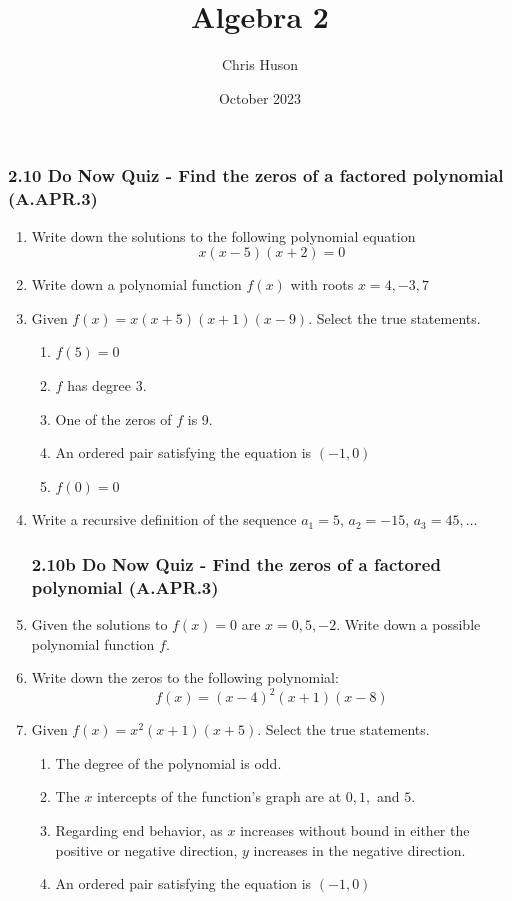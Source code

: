 \documentclass[12pt, twoside]{article}
\title{Algebra 2}
\author{Chris Huson}
\date{October 2023}
\begin{document}
\subsubsection*{2.10 Do Now Quiz - Find the zeros of a factored polynomial (A.APR.3)}
\begin{enumerate}[itemsep=1.5cm]
\item Write down the solutions to the following polynomial equation
\[x(x-5)(x+2)=0\]

\item Write down a polynomial function $f(x)$ with roots $x=4, -3, 7$

\item Given $f(x) = x(x+5)(x+1)(x-9)$. Select the true statements.
    \begin{enumerate}
    \item $f(5)=0$
    \item $f$ has degree 3.
    \item One of the zeros of $f$ is 9.
    \item An ordered pair satisfying the equation is $(-1,0)$
    \item $f(0)=0$
    \end{enumerate}

\item Write a recursive definition of the sequence $a_1 = 5$, $a_2 = -15$, $a_3 = 45, \ldots$

\newpage
\subsubsection*{2.10b Do Now Quiz - Find the zeros of a factored polynomial (A.APR.3)}
\setcounter{enumi}{0}

\item Given the solutions to $f(x)=0$ are $x=0, 5, -2$. Write down a possible polynomial function $f$.

\item Write down the zeros to the following polynomial:
\[f(x) = (x-4)^2 (x+1)(x-8)\]

\item Given $f(x) = x^2(x+1)(x+5)$. Select the true statements.
    \begin{enumerate}
    \item The degree of the polynomial is odd.
    \item The $x$ intercepts of the function's graph are at $0, 1,$ and $5$.
    \item Regarding end behavior, as $x$ increases without bound in either the positive or negative direction, $y$ increases in the negative direction.
    \item An ordered pair satisfying the equation is $(-1,0)$
    \end{enumerate}


\end{enumerate}
\end{document}
